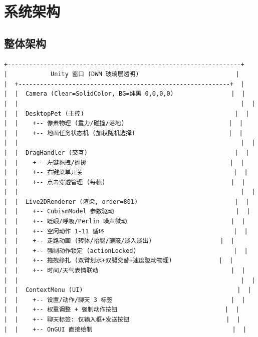 \documentclass[12pt,a4paper]{ctexart}
\begin{document}
\section{系统架构}

\subsection{整体架构}

\begin{lstlisting}[frame=single,numbers=none,style=csharp]
+-----------------------------------------------------------------+
|            Unity 窗口 (DWM 玻璃层透明)                           |
|  +-----------------------------------------------------------+  |
|  |  Camera (Clear=SolidColor, BG=纯黑 0,0,0,0)                |  |
|  |                                                              |  |
|  |  DesktopPet (主控)                                          |  |
|  |    +-- 像素物理 (重力/碰撞/落地)                             |  |
|  |    +-- 地面任务状态机 (加权随机选择)                          |  |
|  |                                                              |  |
|  |  DragHandler (交互)                                         |  |
|  |    +-- 左键拖拽/抛掷                                        |  |
|  |    +-- 右键菜单开关                                          |  |
|  |    +-- 点击穿透管理 (每帧)                                   |  |
|  |                                                              |  |
|  |  Live2DRenderer (渲染, order=801)                           |  |
|  |    +-- CubismModel 参数驱动                                  |  |
|  |    +-- 眨眼/呼吸/Perlin 噪声微动                             |  |
|  |    +-- 空闲动作 1-11 循环                                    |  |
|  |    +-- 走路动画 (转体/抬腿/颠簸/淡入淡出)                   |  |
|  |    +-- 强制动作锁定 (actionLocked)                           |  |
|  |    +-- 拖拽挣扎 (双臂划水+双腿交替+速度驱动物理)             |  |
|  |    +-- 时间/天气表情联动                                     |  |
|  |                                                              |  |
|  |  ContextMenu (UI)                                           |  |
|  |    +-- 设置/动作/聊天 3 标签                                 |  |
|  |    +-- 权重调整 + 强制动作按钮                              |  |
|  |    +-- 聊天标签: 仅输入框+发送按钮                           |  |
|  |    +-- OnGUI 直接绘制                                       |  |

\end{lstlisting}
\end{document}
